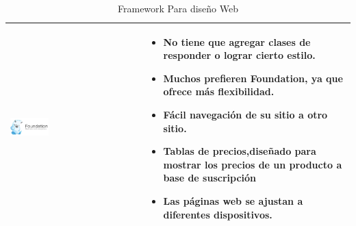 \begin{table}[b!]
\begin{tabular}{|p{1cm}|l}
        \hline
          \multicolumn{1}{|p{5cm}|}{\includegraphics[width=0.3\textwidth]{images/foundation}} & 
          \multicolumn{1}{p{10cm}|}{ 
          \begin{itemize}
                 \vspace{-20mm}
          \setlist[itemize]{noitemsep, topsep=0pt}  
          	\item No tiene que agregar clases de responder o lograr cierto estilo.
			\item Muchos prefieren Foundation, ya que ofrece más flexibilidad.
			\item Fácil navegación de su sitio a otro sitio.
            \item Tablas de precios,diseñado para mostrar los precios de un producto a base de suscripción
            \item Las páginas web se ajustan a diferentes dispositivos.
         \end{itemize}}\\ 
        \hline
      \end{tabular}
      \caption{Framework Para diseño Web}
      \label{Analisis de riesgos}
    \end{table}
\newpage
